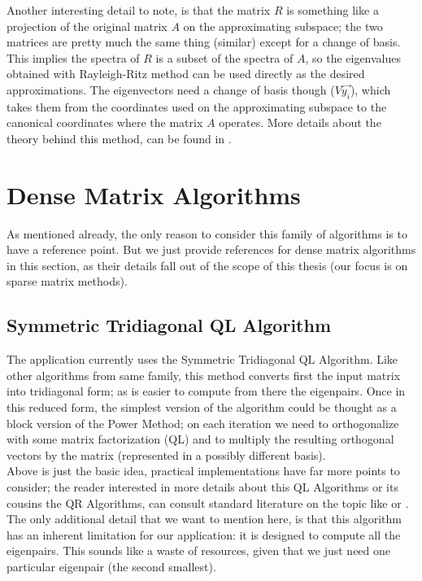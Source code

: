Another interesting detail to note, is that the
matrix $R$ is something like a projection of the original matrix $A$
on the approximating subspace; the two matrices are pretty much the
same thing (similar) except for a change of 
basis. This implies the spectra of $R$ is a subset of the spectra of
$A$, so the eigenvalues obtained with Rayleigh-Ritz method can be used
directly as the desired approximations. The eigenvectors need a change
of basis though ($V\vec{y_i}$), which takes them from the coordinates
used on the approximating subspace to the canonical coordinates where
the matrix $A$ operates. More details about the theory behind this
method, can be found in \cite{saad92}.

\section{Dense Matrix Algorithms}

As mentioned already, the only reason to consider this family of
algorithms is to have a reference point. But we just provide references for 
dense matrix algorithms in this section, as their details fall out of the scope of
this thesis (our focus is on sparse matrix methods). \\

\subsection{Symmetric Tridiagonal QL Algorithm}
The application currently uses the Symmetric Tridiagonal QL
Algorithm. Like other algorithms from same family, this method
converts first the input matrix into tridiagonal form; as is easier to
compute from there the eigenpairs. Once in this reduced form, the
simplest version of the algorithm could be thought as a block
version of the Power Method; on each iteration we need to
orthogonalize with some matrix factorization (QL) and to multiply the
resulting orthogonal vectors by the matrix (represented in a possibly
different basis). \\

Above is just the basic idea, practical implementations have far
more points to consider; the reader interested in more details about
this QL Algorithms or its cousins the QR Algorithms, can consult
standard literature on the topic like \cite{golub13} or
\cite{parlett80}. The only additional detail that we want to mention
here, is that this algorithm has an inherent limitation for our
application: it is designed to compute all the eigenpairs. This sounds
like a waste of resources, given that we just need one particular
eigenpair (the second smallest). 

